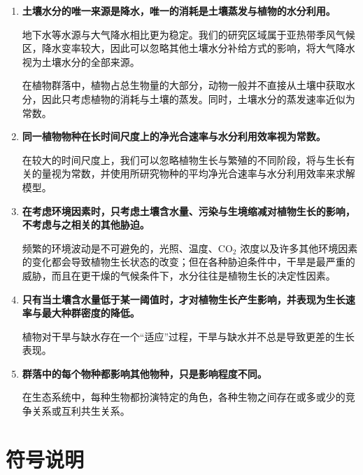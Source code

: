 \documentclass[11pt,a4paper]{ctexart}
\begin{document}
\begin{enumerate}
\item \textbf{土壤水分的唯一来源是降水，唯一的消耗是土壤蒸发与植物的水分利用。}

地下水等水源与大气降水相比更为稳定。我们的研究区域属于亚热带季风气候区，降水变率较大，因此可以忽略其他土壤水分补给方式的影响，将大气降水视为土壤水分的全部来源。

在植物群落中，植物占总生物量的大部分，动物一般并不直接从土壤中获取水分，因此只考虑植物的消耗与土壤的蒸发。同时，土壤水分的蒸发速率近似为常数。

\item \textbf{同一植物物种在长时间尺度上的净光合速率与水分利用效率视为常数。}

在较大的时间尺度上，我们可以忽略植物生长与繁殖的不同阶段，将与生长有关的量视为常数，并使用所研究物种的平均净光合速率与水分利用效率来求解模型。

\item \textbf{在考虑环境因素时，只考虑土壤含水量、污染与生境缩减对植物生长的影响，不考虑与之相关的其他胁迫。}

频繁的环境波动是不可避免的，光照、温度、CO$_2$ 浓度以及许多其他环境因素的变化都会导致植物生长状态的改变；但在各种胁迫条件中，干旱是最严重的威胁\cite{ref8}，而且在更干燥的气候条件下，水分往往是植物生长的决定性因素。

\item \textbf{只有当土壤含水量低于某一阈值时，才对植物生长产生影响，并表现为生长速率与最大种群密度的降低。}

植物对干旱与缺水存在一个“适应”过程，干旱与缺水并不总是导致更差的生长表现\cite{ref3}。

\item \textbf{群落中的每个物种都影响其他物种，只是影响程度不同。}

在生态系统中，每种生物都扮演特定的角色，各种生物之间存在或多或少的竞争关系或互利共生关系。
\end{enumerate}

\section{符号说明}
\end{document}
